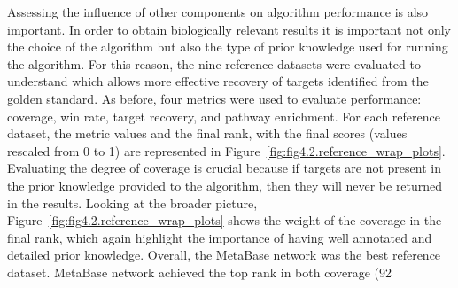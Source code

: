 Assessing the influence of other components on algorithm performance is also important. In order to obtain biologically relevant results it is important not only the choice of the algorithm but also the type of prior knowledge used for running the algorithm. For this reason, the nine reference datasets were evaluated to understand which allows more effective recovery of targets identified from the golden standard. As before, four metrics were used to evaluate performance: coverage, win rate, target recovery, and pathway enrichment. For each reference dataset, the metric values and the final rank, with the final scores (values rescaled from 0 to 1) are represented in Figure~\ref{fig:fig4.2.reference_wrap_plots}. Evaluating the degree of coverage is crucial because if targets are not present in the prior knowledge provided to the algorithm, then they will never be returned in the results. Looking at the broader picture, Figure~\ref{fig:fig4.2.reference_wrap_plots} shows the weight of the coverage in the final rank,  which again highlight the importance of having well annotated and detailed prior knowledge. Overall, the MetaBase network was the best reference dataset. MetaBase network achieved the top rank in both coverage (92%

